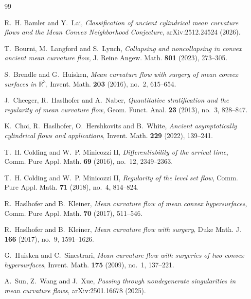 \documentclass[12pt,twoside,reqno]{amsart}
\newcommand{\IR}{\mathbb{R}}
\theoremstyle{definition}
\theoremstyle{remark}
\numberwithin{equation}{section}
\begin{document}
\begin{thebibliography}{99}

R.~H. Bamler and Y.~Lai,
\emph{Classification of ancient cylindrical mean curvature flows and the Mean Convex Neighborhood Conjecture},
arXiv:2512.24524 (2026).

T.~Bourni, M.~Langford and S.~Lynch,
\emph{Collapsing and noncollapsing in convex ancient mean curvature flow},
J. Reine Angew. Math. \textbf{801} (2023), 273--305.

S.~Brendle and G.~Huisken, 
\emph{Mean curvature flow with surgery of mean convex surfaces in $\IR^3$}, 
Invent. Math. \textbf{203} (2016), no.~2, 615--654.

J.~Cheeger, R.~Haslhofer and A.~Naber,
\emph{Quantitative stratification and the regularity of mean curvature flow},
Geom. Funct. Anal. \textbf{23} (2013), no.~3, 828--847.

K.~Choi, R.~Haslhofer, O.~Hershkovits and B.~White,
\emph{Ancient asymptotically cylindrical flows and applications},
Invent. Math. \textbf{229} (2022), 139--241.

T.~H. Colding and W.~P. Minicozzi II,
\emph{Differentiability of the arrival time},
Comm. Pure Appl. Math. \textbf{69} (2016), no.~12, 2349--2363.

T.~H. Colding and W.~P. Minicozzi II,
\emph{Regularity of the level set flow},
Comm. Pure Appl. Math. \textbf{71} (2018), no.~4, 814--824.

R.~Haslhofer and B.~Kleiner,
\emph{Mean curvature flow of mean convex hypersurfaces},
Comm. Pure Appl. Math. \textbf{70} (2017), 511--546.

R.~Haslhofer and B.~Kleiner, 
\emph{Mean curvature flow with surgery}, 
Duke Math. J. \textbf{166} (2017), no.~9, 1591--1626. 

G.~Huisken and C.~Sinestrari, 
\emph{Mean curvature flow with surgeries of two-convex hypersurfaces}, 
Invent. Math. \textbf{175} (2009), no.~1, 137--221.


A.~Sun, Z.~Wang and J.~Xue,
\emph{Passing through nondegenerate singularities in mean curvature flows},
arXiv:2501.16678 (2025).


\end{thebibliography}
\end{document}
